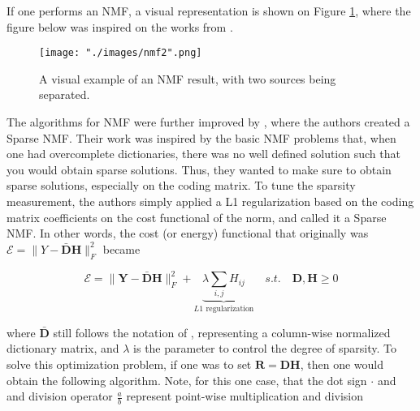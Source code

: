 If one performs an NMF, a visual representation is shown on Figure \ref{fig::nmf_example}, where the figure below was inspired on the works from \cite{singlechannel}.

\begin{figure}[H]
\begin{center}
    \texttt{[image: "./images/nmf2".png]}
    \caption{A visual example of an NMF result, with two sources being separated.}
    \label{fig::nmf_example}
\end{center}
\end{figure}


The algorithms for NMF were further improved by \cite{sparsenmf}, where the authors created a Sparse NMF. Their work was inspired by the basic NMF problems that, when one had overcomplete dictionaries, there was no well defined solution such that you would obtain sparse solutions. Thus, they wanted to make sure to obtain sparse solutions, especially on the coding matrix. To tune the sparsity measurement, the authors simply applied a L1 regularization based on the coding matrix coefficients on the cost functional of the norm, and called it a Sparse NMF. In other words, the cost (or energy) functional that originally was $\mathcal{E} = \| Y - \bar{\bm{D}} \bm{H} \|_F^2$ became

$$\mathcal{E} = \| \bm{Y} - \bar{\bm{D}} \bm{H} \|_F^2 + \underbrace{\lambda \sum_{i,j} H_{ij}}_{L1\text{ regularization}} \quad s.t. \quad \bm{D},\bm{H} \geq 0$$

where $\bar{\bm{D}}$ still follows the notation of \cite{singlechannel}, representing a column-wise normalized dictionary matrix, and $\lambda$ is the parameter to control the degree of sparsity. To solve this optimization problem, if one was to set $\bm{R} = \bm{DH}$, then one would obtain the following algorithm. Note, for this one case, that the dot sign $\cdot$ and and division operator $\frac{a}{b}$ represent point-wise multiplication and division


